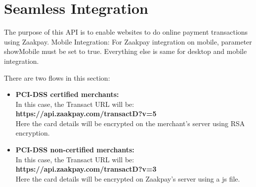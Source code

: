 \documentclass{article}
\begin{document}
\newpage

\section{Seamless Integration}
The purpose of this API is to enable websites to do online payment transactions using Zaakpay. Mobile Integration: For Zaakpay integration on mobile, parameter showMobile must be set to true. Everything else is same for desktop and mobile integration. 

There are two flows in this section:
\begin{itemize}
\item {\bfseries PCI-DSS certified merchants:}\\
In this case, the Transact URL will be: {\bfseries https://api.zaakpay.com/transactD?v=5}\\ Here the card details will be encrypted on the merchant's server using RSA encryption.
\item {\bfseries PCI-DSS non-certified merchants:}\\
In this case, the Transact URL will be: {\bfseries https://api.zaakpay.com/transactD?v=3}\\ Here the card details will be encrypted on Zaakpay's server using a js file.

\end{itemize}
\end{document}
